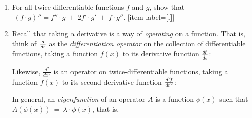 {\begin{enumerate}[item-label={\bfseries \arabic*.}]
 moving along a straight line, then show that:
\begin{alignat*}{2}
 s' ~\text{and}~ s'' ~&\text{have the same sign} \quad&&\Rightarrow\quad \text{the object is accelerating}\\
 s' ~\text{and}~ s'' ~&\text{have opposite signs} &&\Rightarrow\quad \text{the object is decelerating}
\end{alignat*}
 \item For all twice-differentiable functions $f$ and $g$, show that
  $\;(f \cdot g)'' = f'' \cdot g ~+~ 2 f' \cdot g' ~+~ f \cdot g''$.
[item-label={{[\bfseries \arabic*.]}}]
 \item Recall that taking a derivative is a way of
 \emph{operating} on a function. That is, think of $\ddx$ as the
 \emph{differentiation operator} on the collection of differentiable functions,
 taking a function $f(x)$ to its derivative function $\dfdx$:
 \begin{center}
 \end{center}
  Likewise, $\frac{d^2}{d\!x^2}$ is an operator on twice-differentiable
  functions, taking a function $f(x)$ to its second derivative function
  $\frac{d^2 \negmedspace f}{d\!x^2}$:
 \begin{center}
 \end{center}
  In general, an \emph{eigenfunction} of an operator $A$ is a function
  $\phi(x)$ such that $A(\phi(x)) ~=~ \lambda \cdot \phi(x)$, that is,
 \begin{center}
  \begin{tikzpicture}[every node/.style={minimum width=2cm,minimum height=8mm}]

\end{tikzpicture}
\end{center}
\end{enumerate}}
